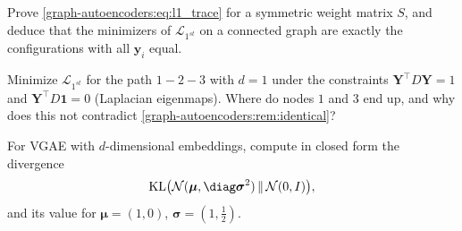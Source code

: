 \begin{notechapter}
\begin{exercise}\label{graph-autoencoders:exr:2}
Prove \cref{graph-autoencoders:eq:l1_trace} for a symmetric weight matrix $S$, and deduce that the minimizers of $\mathcal L_{1^{st}}$ on a connected graph are exactly the configurations with all $\bm y_i$ equal.
\end{exercise}

\begin{exercise}\label{graph-autoencoders:exr:3}
Minimize $\mathcal L_{1^{st}}$ for the path $1 - 2 - 3$ with $d = 1$ under the constraints $\bm Y^\top D\bm Y = 1$ and $\bm Y^\top D\mathbf 1 = 0$ (Laplacian eigenmaps). Where do nodes $1$ and $3$ end up, and why does this not contradict \cref{graph-autoencoders:rem:identical}?
\end{exercise}

\begin{exercise}\label{graph-autoencoders:exr:4}
For VGAE with $d$-dimensional embeddings, compute in closed form the divergence
\[
\mathrm{KL}\bigl(\mathcal N(\boldsymbol\mu, \diag\boldsymbol\sigma^2)\,\|\,\mathcal N(0, I)\bigr),
\] and its value for $\boldsymbol\mu = (1, 0)$, $\boldsymbol\sigma = (1, \frac12)$.
\end{exercise}

\end{notechapter}
